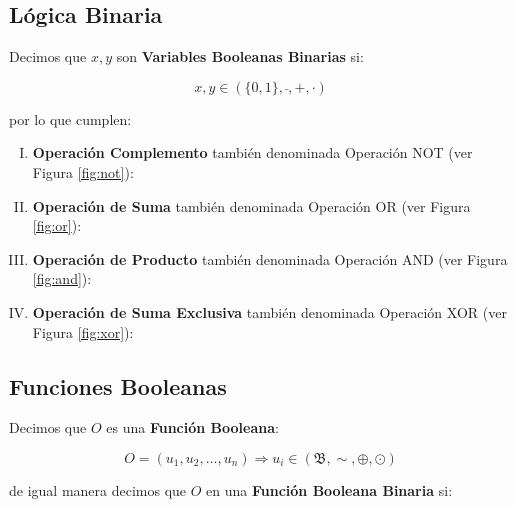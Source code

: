 \subsection{Lógica Binaria}

 Decimos que $x,y$ son \textbf{Variables Booleanas Binarias} si:

\begin{equation}
x,y \in (\{0,1\}, \bar{ }, +, \cdot)
\end{equation}

por lo que cumplen:

\begin{enumerate}[I.]

\item \textbf{Operación Complemento} también denominada Operación NOT (ver Figura \ref{fig:not}):




\item \textbf{Operación de Suma} también denominada Operación OR (ver Figura \ref{fig:or}):




\item \textbf{Operación de Producto} también denominada Operación AND (ver Figura \ref{fig:and}):



\item \textbf{Operación de Suma Exclusiva} también denominada Operación XOR (ver Figura \ref{fig:xor}):



\end{enumerate}

\subsection{Funciones Booleanas}

 Decimos que $O$ es una \textbf{Función Booleana}:

\begin{equation}
O = (u_1,u_2,\ldots,u_n) \Rightarrow u_i \in (\mathfrak{B}, \sim, \oplus, \odot)
\end{equation}

de igual manera decimos que $O$ en una \textbf{Función Booleana Binaria} si:

